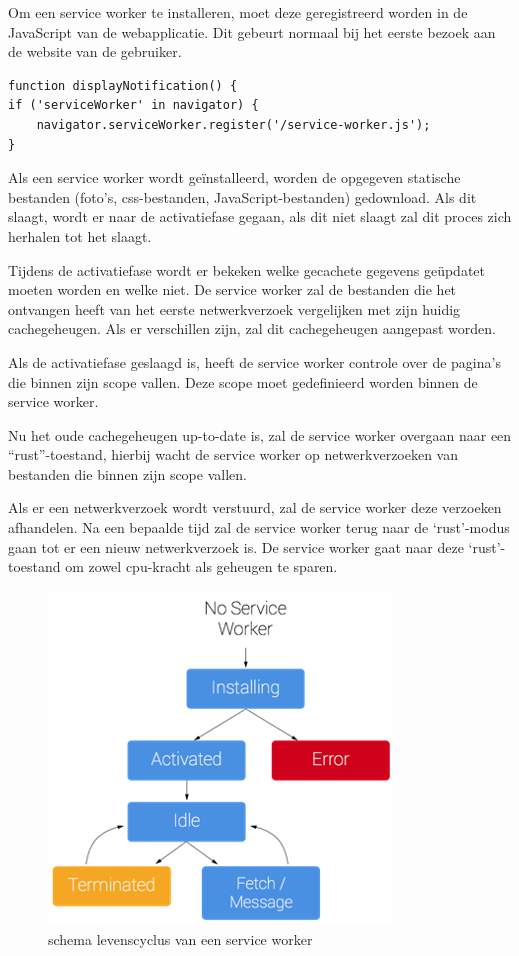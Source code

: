 			Om een service worker te installeren, moet deze geregistreerd worden in de JavaScript van de webapplicatie. Dit gebeurt normaal bij het eerste bezoek aan de website van de gebruiker.
			
\begin{lstlisting}
function displayNotification() {
if ('serviceWorker' in navigator) {
	navigator.serviceWorker.register('/service-worker.js');
}
\end{lstlisting}
	
		Als een service worker wordt geïnstalleerd, worden de opgegeven statische bestanden (foto’s, css-bestanden, JavaScript-bestanden) gedownload. Als dit slaagt, wordt er naar de activatiefase gegaan, als dit niet slaagt zal dit proces zich herhalen tot het slaagt. 
		
		Tijdens de activatiefase wordt er bekeken welke gecachete gegevens geüpdatet moeten worden en welke niet. De service worker zal de bestanden die het ontvangen heeft van het eerste netwerkverzoek vergelijken met zijn huidig cachegeheugen. Als er verschillen zijn, zal dit cachegeheugen aangepast worden.
		
		Als de activatiefase geslaagd is, heeft de service worker controle over de pagina's die binnen zijn scope vallen. Deze scope moet gedefinieerd worden binnen de service worker.
		
		Nu het oude cachegeheugen up-to-date is, zal de service worker overgaan naar een “rust”-toestand, hierbij wacht de service worker op netwerkverzoeken van bestanden die binnen zijn scope vallen.
		
		Als er een netwerkverzoek wordt verstuurd, zal de service worker deze verzoeken afhandelen. Na een bepaalde tijd zal de service worker terug naar de ‘rust’-modus gaan tot er een nieuw netwerkverzoek is. De service worker gaat naar deze ‘rust’-toestand om zowel cpu-kracht als geheugen te sparen.
		\autocite{Gaunt2019}
		
		
		\begin{figure}[H]
			\centering
			\includegraphics{./img/ServiceWorkerLifeCycle.png}
			\caption{schema levenscyclus van een service worker \autocite{Gaunt2019}}
		\end{figure}
	

